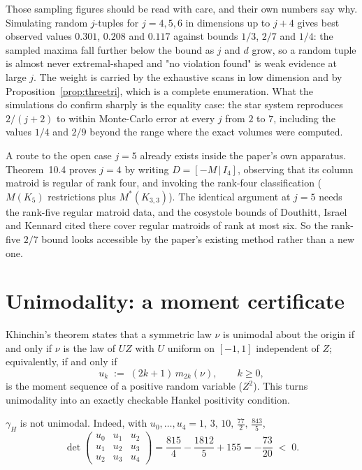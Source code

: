 Those sampling figures should be read with care, and their own numbers
say why.  Simulating random $j$-tuples for $j=4,5,6$ in dimensions up to
$j+4$ gives best observed values $0.301$, $0.208$ and $0.117$ against
bounds $1/3$, $2/7$ and $1/4$: the sampled maxima fall further below the
bound as $j$ and $d$ grow, so a random tuple is almost never
extremal-shaped and "no violation found" is weak evidence at large $j$.
The weight is carried by the exhaustive scans in low dimension and by
Proposition~\ref{prop:threetri}, which is a complete enumeration.  What
the simulations do confirm sharply is the equality case: the star system
reproduces $2/(j+2)$ to within Monte-Carlo error at every $j$ from $2$
to $7$, including the values $1/4$ and $2/9$ beyond the range where the
exact volumes were computed.

A route to the open case $j=5$ already exists inside the paper's own
apparatus.  Theorem~10.4 proves $j=4$ by writing $D=[-M\,|\,I_4]$,
observing that its column matroid is regular of rank four, and invoking
the rank-four classification ($M(K_5)$ restrictions plus
$M^*(K_{3,3})$).  The identical argument at $j=5$ needs the rank-five
regular matroid data, and the cosystole bounds of Douthitt, Israel and
Kennard cited there cover regular matroids of rank at most six.  So the
rank-five $2/7$ bound looks accessible by the paper's existing method
rather than a new one.

\section{Unimodality: a moment certificate}

Khinchin's theorem states that a symmetric law $\nu$ is unimodal about
the origin if and only if $\nu$ is the law of $UZ$ with $U$ uniform on
$[-1,1]$ independent of $Z$; equivalently, if and only if
\[
u_k\;:=\;(2k+1)\,m_{2k}(\nu),\qquad k\ge0,
\]
is the moment sequence of a positive random variable ($Z^2$).  This turns
unimodality into an exactly checkable Hankel positivity condition.

\begin{proposition}\label{prop:hnonuni}
$\gamma_H$ is not unimodal.  Indeed, with
$u_0,\dots,u_4=1,\,3,\,10,\,\tfrac{77}2,\,\tfrac{843}5$,
\[
\det\begin{pmatrix}u_0&u_1&u_2\\u_1&u_2&u_3\\u_2&u_3&u_4\end{pmatrix}
=\frac{815}{4}-\frac{1812}{5}+155=-\frac{73}{20}\;<\;0 .
\]
\end{proposition}

